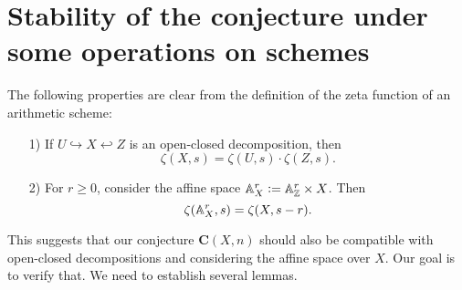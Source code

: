 
\section{Stability of the conjecture under some operations on schemes}
\label{secion:stability-of-the-conjecture}

The following properties are clear from the definition of the zeta function of
an arithmetic scheme:

\begin{enumerate}
\item[1)] If $U \hookrightarrow X \hookleftarrow Z$ is an open-closed
  decomposition, then
  \begin{equation}
    \label{eqn:zeta-function-for-an-open-closed-decomposition}
    \zeta (X,s) = \zeta (U,s)\cdot \zeta (Z,s).
  \end{equation}

\item[2)] For $r \ge 0$, consider the affine space
  $\mathbb{A}^r_X \mathrel{\mathop:}= \mathbb{A}^r_{\mathbb{Z}} \times X$. Then
  \begin{equation}
    \label{eqn:zeta-function-for-the-affine-space}
    \zeta (\AA^r_X,s) = \zeta (X,s-r).
  \end{equation}
\end{enumerate}

This suggests that our conjecture $\mathbf{C} (X,n)$ should also be compatible
with open-closed decompositions and considering the affine space over $X$.
Our goal is to verify that. We need to establish several lemmas.


